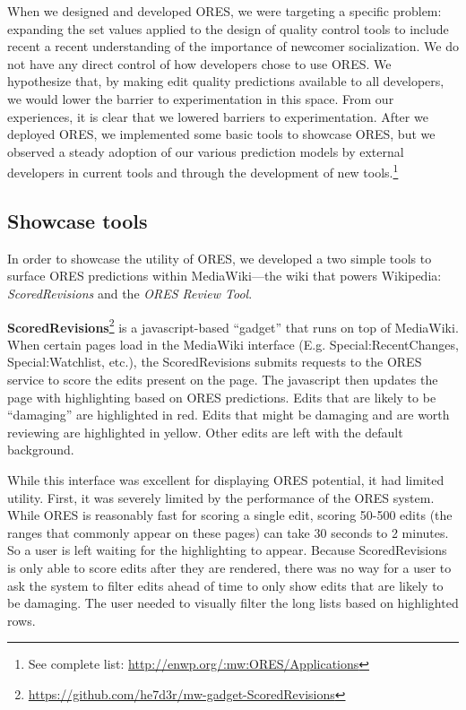 When we designed and developed ORES, we were targeting a specific problem: expanding the set values applied to the design of quality control tools to include recent a recent understanding of the importance of newcomer socialization.  We do not have any direct control of how developers chose to use ORES.  We hypothesize that, by making edit quality predictions available to all developers, we would lower the barrier to experimentation in this space.  From our experiences, it is clear that we lowered barriers to experimentation.  After we deployed ORES, we implemented some basic tools to showcase ORES, but we observed a steady adoption of our various prediction models by external developers in current tools and through the development of new tools.\footnote{See complete list: \url{http://enwp.org/:mw:ORES/Applications}}

\subsection{Showcase tools}
In order to showcase the utility of ORES, we developed a two simple tools to surface ORES predictions within MediaWiki---the wiki that powers Wikipedia: \emph{ScoredRevisions} and the \emph{ORES Review Tool}.

\textbf{ScoredRevisions}\footnote{\url{https://github.com/he7d3r/mw-gadget-ScoredRevisions}} is a javascript-based ``gadget'' that runs on top of MediaWiki.  When certain pages load in the MediaWiki interface (E.g. Special:RecentChanges, Special:Watchlist, etc.), the ScoredRevisions submits requests to the ORES service to score the edits present on the page.  The javascript then updates the page with highlighting based on ORES predictions.  Edits that are likely to be ``damaging'' are highlighted in red.  Edits that might be damaging and are worth reviewing are highlighted in yellow.  Other edits are left with the default background.

While this interface was excellent for displaying ORES potential, it had limited utility.  First, it was severely limited by the performance of the ORES system.  While ORES is reasonably fast for scoring a single edit, scoring 50-500 edits (the ranges that commonly appear on these pages) can take 30 seconds to 2 minutes.  So a user is left waiting for the highlighting to appear.  Because ScoredRevisions is only able to score edits after they are rendered, there was no way for a user to ask the system to filter edits ahead of time to only show edits that are likely to be damaging.  The user needed to visually filter the long lists based on highlighted rows.

